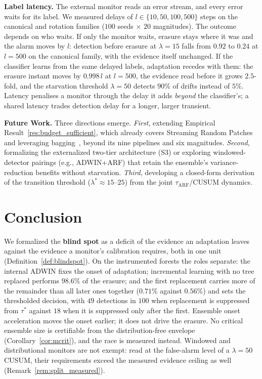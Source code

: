 \documentclass[smallextended]{svjour3}
\newcommand{\NoSwapLeak}{18}                 %
\newcommand{\LearnSharePure}{98.6}           %
\newcommand{\SwapFirstShare}{0.71}           %
\newcommand{\SwapRestShare}{0.56}            %
\newcommand{\AbInitDetect}{49}               %
\begin{document}
\textbf{Label latency.} The external monitor reads an error stream, and every error waits for its label. We measured delays of $l \in \{10, 50, 100, 500\}$ steps on the canonical and rotation families ($100$ seeds $\times$ $20$ magnitudes). The outcome depends on who waits. If only the monitor waits, erasure stays where it was and the alarm moves by $l$: detection before erasure at $\lambda = 15$ falls from $0.92$ to $0.24$ at $l = 500$ on the canonical family, with the evidence itself unchanged. If the classifier learns from the same delayed labels, adaptation recedes with them: the erasure instant moves by $0.998\,l$ at $l = 500$, the evidence read before it grows $2.5$-fold, and the starvation threshold $\lambda = 50$ detects $90\%$ of drifts instead of $5\%$. Latency penalises a monitor through the delay it adds \emph{beyond} the classifier's; a shared latency trades detection delay for a longer, larger transient.

\textbf{Future Work.} Three directions emerge. \emph{First}, extending Empirical Result~\ref{res:budget_sufficient}, which already covers Streaming Random Patches and leveraging bagging~\cite{bifet_leveraging_2010}, beyond its nine pipelines and six magnitudes. \emph{Second}, formalizing the externalized two-tier architecture (S3) or exploring windowed-detector pairings (e.g., ADWIN+ARF) that retain the ensemble's variance-reduction benefits without starvation. \emph{Third}, developing a closed-form derivation of the transition threshold ($\lambda^* \approx 15$--$25$) from the joint $\tau_{\mathrm{ARF}}$/CUSUM dynamics.

\section{Conclusion}\label{sec:conclusion}

We formalized the \textbf{blind spot} as a deficit of the evidence an adaptation leaves against the evidence a monitor's calibration requires, both in one unit (Definition~\ref{def:blindspot}). On the instrumented forests the roles separate: the internal ADWIN fixes the onset of adaptation; incremental learning with no tree replaced performs $\LearnSharePure\%$ of the erasure; and the first replacement carries more of the remainder than all later ones together ($\SwapFirstShare\%$ against $\SwapRestShare\%$) and sets the thresholded decision, with $\AbInitDetect$ detections in $100$ when replacement is suppressed from $\tau^*$ against $\NoSwapLeak$ when it is suppressed only after the first. Ensemble onset acceleration moves the onset earlier; it does not drive the erasure. No critical ensemble size is certifiable from the distribution-free envelope (Corollary~\ref{cor:mcrit}), and the race is measured instead. Windowed and distributional monitors are not exempt: read at the false-alarm level of a $\lambda = 50$ CUSUM, their requirements exceed the measured evidence ceiling as well (Remark~\ref{rem:split_measured}).
\end{document}
